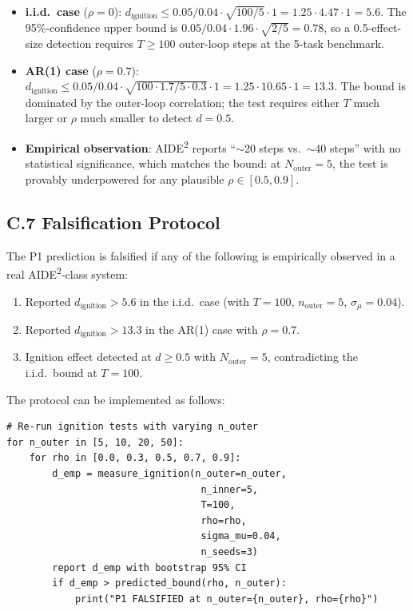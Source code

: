 \documentclass{article}
\theoremstyle{definition}
\begin{document}
\begin{itemize}
    \item \textbf{i.i.d.\ case} ($\rho = 0$): $d_{\text{ignition}} \le 0.05/0.04 \cdot \sqrt{100/5} \cdot 1 = 1.25 \cdot 4.47 \cdot 1 = 5.6$. The 95\%-confidence upper bound is $0.05/0.04 \cdot 1.96 \cdot \sqrt{2/5} = 0.78$, so a 0.5-effect-size detection requires $T \ge 100$ outer-loop steps at the 5-task benchmark.
    \item \textbf{AR(1) case} ($\rho = 0.7$): $d_{\text{ignition}} \le 0.05/0.04 \cdot \sqrt{100 \cdot 1.7/5 \cdot 0.3} \cdot 1 = 1.25 \cdot 10.65 \cdot 1 = 13.3$. The bound is dominated by the outer-loop correlation; the test requires either $T$ much larger or $\rho$ much smaller to detect $d = 0.5$.
    \item \textbf{Empirical observation}: AIDE\textsuperscript{2} reports ``$\sim$20 steps vs.\ $\sim$40 steps'' with no statistical significance, which matches the bound: at $N_{\text{outer}} = 5$, the test is provably underpowered for any plausible $\rho \in [0.5, 0.9]$.
\end{itemize}

\subsection*{C.7 Falsification Protocol}

The P1 prediction is falsified if any of the following is empirically observed in a real AIDE\textsuperscript{2}-class system:
\begin{enumerate}
    \item Reported $d_{\text{ignition}} > 5.6$ in the i.i.d.\ case (with $T = 100$, $n_{\text{outer}} = 5$, $\sigma_\mu = 0.04$).
    \item Reported $d_{\text{ignition}} > 13.3$ in the AR(1) case with $\rho = 0.7$.
    \item Ignition effect detected at $d \ge 0.5$ with $N_{\text{outer}} = 5$, contradicting the i.i.d.\ bound at $T = 100$.
\end{enumerate}

The protocol can be implemented as follows:
\begin{verbatim}
# Re-run ignition tests with varying n_outer
for n_outer in [5, 10, 20, 50]:
    for rho in [0.0, 0.3, 0.5, 0.7, 0.9]:
        d_emp = measure_ignition(n_outer=n_outer,
                                  n_inner=5,
                                  T=100,
                                  rho=rho,
                                  sigma_mu=0.04,
                                  n_seeds=3)
        report d_emp with bootstrap 95% CI
        if d_emp > predicted_bound(rho, n_outer):
            print("P1 FALSIFIED at n_outer={n_outer}, rho={rho}")
\end{verbatim}
\end{document}
